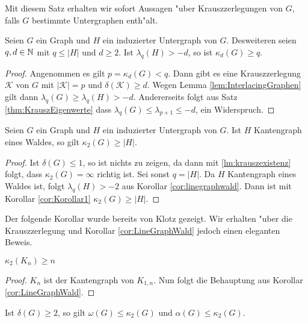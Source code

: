 Mit diesem Satz erhalten wir sofort Aussagen "uber Krauszzerlegungen von $G$, falls $G$ bestimmte Untergraphen enth"alt.
\begin{corollary}
  \label{cor:Korollar1}
  Seien $G$ ein Graph und $H$ ein induzierter Untergraph von $G$. Desweiteren seien $q,d \in {\mathbb{N}}$ mit $q \leq |H|$ und $d \geq 2$.
  Ist $\lambda_{q}(H) > -d$, so ist $\kappa_{d}(G) \geq q$.
\end{corollary}
\begin{proof}
  Angenommen es gilt $p = \kappa_{d}(G) < q$. Dann gibt es  eine Krauszzerlegung $\mathcal{K}$ von $G$ mit $|\mathcal{K}| = p$ und $\delta(\mathcal{K}) \geq d$. Wegen Lemma \ref{lem:InterlacingGraphen} gilt dann $\lambda_{q}(G) \geq \lambda_{q}(H) > -d $. Andererseits folgt aus Satz \ref{thm:KrauszEigenwerte} dass $\lambda_{q}(G) \leq \lambda_{p+1} \leq -d $, ein Widerspruch. 
\end{proof}

\begin{corollary}
  \label{cor:LineGraphWald}
  Seien $G$ ein Graph und $H$ ein induzierter Untergraph von $G$. Ist $H$ Kantengraph eines Waldes, so gilt 
  $\kappa_{2}(G)\geq \left|H\right|$.
\end{corollary}

\begin{proof}
  Ist $\delta(G) \leq 1$, so ist nichts zu zeigen, da dann mit \ref{lm:krauszexistenz} folgt, dass $\kappa_2(G) = \infty$ richtig ist.
  Sei sonst $q = |H|$. Da $H$ Kantengraph eines Waldes ist, folgt $\lambda_{q}(H) > -2$ aus Korollar \ref{cor:linegraphwald}.
  Dann ist mit Korollar \ref{cor:Korollar1} $\kappa_{2}\left( G \right) \geq \left| H\right|$.
\end{proof}
Der folgende Korollar wurde bereits von Klotz \cite{Klotz89} gezeigt. Wir erhalten "uber die Krauszzerlegung und Korollar \ref{cor:LineGraphWald} jedoch einen eleganten Beweis.
\begin{corollary}[Klotz]
  $\kappa_{2}\left( K_n \right) \geq n$
\end{corollary}

\begin{proof}
  $K_n$ ist der Kantengraph von $K_{1,n}$. Nun folgt die Behauptung aus Korollar \ref{cor:LineGraphWald}.
\end{proof}
\begin{corollary}
  Ist $\delta\left( G \right) \geq 2$, so gilt $\omega\left( G \right)\leq \kappa_{2}\left( G \right)$ und $\alpha\left( G \right)\leq \kappa_{2}\left( G \right)$.
  \label{cor:alphaomegakrausz}
\end{corollary}

